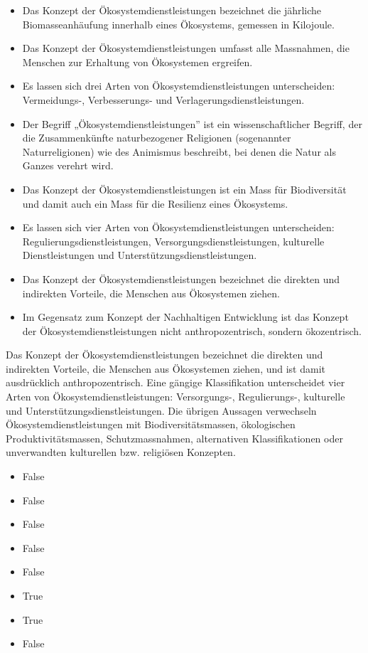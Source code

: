 \documentclass[
  nswissgerman,
  a4paper,
  openany]{book}
\providecommand{\tightlist}{%
  \setlength{\itemsep}{0pt}\setlength{\parskip}{0pt}}
\begin{document}
\begin{itemize}
\tightlist
\item[$\square$]
  Das Konzept der Ökosystemdienstleistungen bezeichnet die jährliche
  Biomasseanhäufung innerhalb eines Ökosystems, gemessen in Kilojoule.
\item[$\square$]
  Das Konzept der Ökosystemdienstleistungen umfasst alle Massnahmen, die
  Menschen zur Erhaltung von Ökosystemen ergreifen.
\item[$\square$]
  Es lassen sich drei Arten von Ökosystemdienstleistungen unterscheiden:
  Vermeidungs-, Verbesserungs- und Verlagerungsdienstleistungen.
\item[$\square$]
  Der Begriff „Ökosystemdienstleistungen'' ist ein wissenschaftlicher
  Begriff, der die Zusammenkünfte naturbezogener Religionen (sogenannter
  Naturreligionen) wie des Animismus beschreibt, bei denen die Natur als
  Ganzes verehrt wird.
\item[$\square$]
  Das Konzept der Ökosystemdienstleistungen ist ein Mass für
  Biodiversität und damit auch ein Mass für die Resilienz eines
  Ökosystems.
\item[$\square$]
  Es lassen sich vier Arten von Ökosystemdienstleistungen unterscheiden:
  Regulierungsdienstleistungen, Versorgungsdienstleistungen, kulturelle
  Dienstleistungen und Unterstützungsdienstleistungen.
\item[$\square$]
  Das Konzept der Ökosystemdienstleistungen bezeichnet die direkten und
  indirekten Vorteile, die Menschen aus Ökosystemen ziehen.
\item[$\square$]
  Im Gegensatz zum Konzept der Nachhaltigen Entwicklung ist das Konzept
  der Ökosystemdienstleistungen nicht anthropozentrisch, sondern
  ökozentrisch.
\end{itemize}

Das Konzept der Ökosystemdienstleistungen bezeichnet die direkten und
indirekten Vorteile, die Menschen aus Ökosystemen ziehen, und ist damit
ausdrücklich anthropozentrisch. Eine gängige Klassifikation
unterscheidet vier Arten von Ökosystemdienstleistungen: Versorgungs-,
Regulierungs-, kulturelle und Unterstützungsdienstleistungen. Die
übrigen Aussagen verwechseln Ökosystemdienstleistungen mit
Biodiversitätsmassen, ökologischen Produktivitätsmassen,
Schutzmassnahmen, alternativen Klassifikationen oder unverwandten
kulturellen bzw. religiösen Konzepten.

\begin{itemize}
\tightlist
\item
  False
\item
  False
\item
  False
\item
  False
\item
  False
\item
  True
\item
  True
\item
  False
\end{itemize}
\end{document}
